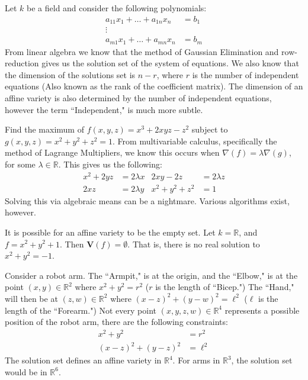 \documentclass[crop=false,class=book]{standalone}
\begin{document}
\begin{example}
Let $k$ be a field and consider the following polynomials:
\begin{align*}
    a_{11}x_{1}+\hdots+a_{1n}x_{n}&=b_{1}\\
    \vdots&\\
    a_{m1}x_{1}+\hdots+a_{mn}x_{n}&=b_{m}
\end{align*}
From linear algebra we know that the method of Gaussian Elimination and row-reduction gives us the solution set of the system of equations. We also know that the dimension of the solutions set is $n-r$, where $r$ is the number of independent equations (Also known as the rank of the coefficient matrix). The dimension of an affine variety is also determined by the number of independent equations, however the term ``Independent," is much more subtle.
\end{example}
\begin{example}
Find the maximum of $f(x,y,z) = x^3+2xyz-z^2$ subject to $g(x,y,z) = x^2+y^2+z^2=1$. From multivariable calculus, specifically the method of Lagrange Multipliers, we know this occurs when $\nabla(f) = \lambda \nabla(g)$, for some $\lambda \in \mathbb{R}$. This gives us the following:
\begin{align*}
    x^{2}+2yz&=2\lambda x & 2xy-2z&=2\lambda z\\
    2xz&=2\lambda y & x^{2}+y^{2}+z^2&=1
\end{align*}
Solving this via algebraic means can be a nightmare. Various algorithms exist, however.
\end{example}
\begin{remark}
It is possible for an affine variety to be the empty set. Let $k=\mathbb{R}$, and $f=x^{2}+y^{2}+1$. Then $\mathbf{V}(f)=\emptyset$. That is, there is no real solution to $x^2+y^2 = -1$.
\end{remark}
\begin{example}
Consider a robot arm. The ``Armpit," is at the origin, and the ``Elbow," is at the point $(x,y)\in \mathbb{R}^2$ where $x^2+y^2 = r^2$ ($r$ is the length of ``Bicep.") The ``Hand," will then be at $(z,w)\in \mathbb{R}^2$ where $(x-z)^2 + (y-w)^2 = \ell^2$ ($\ell$ is the length of the ``Forearm.") Not every point $(x,y,z,w)\in \mathbb{R}^4$ represents a possible position of the robot arm, there are the following constraints:
\begin{align*}
    x^{2}+y^{2}&=r^{2}\\ 
    (x-z)^{2}+(y-z)^{2}&=\ell^{2}
\end{align*}
The solution set defines an affine variety in $\mathbb{R}^4$. For arms in $\mathbb{R}^3$, the solution set would be in $\mathbb{R}^6$.
\end{example}
\end{document}

